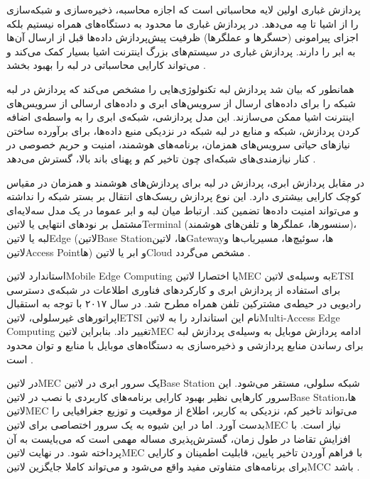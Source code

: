 پردازش غباری اولین لایه محاسباتی است که اجازه محاسبه، ذخیره‌سازی و شبکه‌سازی را از اشیا تا مِه می‌دهد. در پردازش غباری ما محدود به دستگاه‌های همراه نیستیم بلکه اجزای پیرامونی (حسگرها و عملگرها)
ظرفیت پیش‌پردازش داده‌ها قبل از ارسال آن‌ها به ابر را دارند. پردازش غباری در سیستم‌های بزرگ اینترنت اشیا بسیار کمک می‌کند و می‌تواند کارایی محاسباتی در لبه را بهبود بخشد
.


همانطور که بیان شد پردازش لبه تکنولوژی‌هایی را مشخص می‌کند که پردازش در لبه شبکه را برای داده‌های ارسال از سرویس‌های ابری و داده‌های ارسالی از سرویس‌های اینترنت اشیا ممکن می‌سازند.
این مدل پردازشی، شبکه‌ی ابری را به واسطه‌ی اضافه کردن پردازش، شبکه و منابع در لبه شبکه در نزدیکی منبع داده‌ها، برای برآورده ساختن نیازهای حیاتی سرویس‌های همزمان، برنامه‌های هوشمند،
امنیت و حریم خصوصی در کنار نیازمندی‌های شبکه‌ای چون تاخیر کم و پهنای باند بالا، گسترش می‌دهد
.

در مقابل پردازش ابری، پردازش در لبه برای پردازش‌های هوشمند و همزمان در مقیاس کوچک کارایی بیشتری دارد. این نوع پردازش ریسک‌های انتقال بر بستر شبکه را نداشته و می‌تواند امنیت داده‌ها تضمین کند.
ارتباط میان لبه و ابر عموما در یک مدل سه‌لایه‌ای مشتمل بر نودهای انتهایی یا ‌لاتین{Terminal} (سنسورها، عملگرها و تلفن‌های هوشمند)،
لبه یا ‌لاتین{Edge} (‌لاتین{Base Station}ها، ‌لاتین{Gateway}ها، سوئیچ‌ها، مسیریاب‌ها و ‌لاتین{Access Point}ها)
و ابر یا ‌لاتین{Cloud} مشخص می‌گردد
.


استاندارد ‌لاتین{Mobile Edge Computing} یا اختصارا ‌لاتین{MEC} به وسیله‌ی ‌لاتین{ETSI} برای استفاده از پردازش ابری و کارکردهای فناوری اطلاعات در شبکه‌ی دسترسی رادیویی
در حیطه‌ی مشترکین تلفن همراه مطرح شد. در سال ۲۰۱۷ با توجه به استقبال اپراتورهای غیرسلولی، ‌لاتین{ETSI} نام این استاندارد را به ‌لاتین{Multi-Access Edge Computing}
تغییر داد. بنابراین ‌لاتین{MEC} ادامه پردازش موبایل به وسیله‌ی پردازش لبه برای رساندن منابع پردازشی و ذخیره‌سازی به دستگاه‌های موبایل با منابع و توان محدود است
.

در ‌لاتین{MEC} یک سرور ابری در ‌لاتین{Base Station} شبکه سلولی، مستقر می‌شود. این سرور کارهایی نظیر بهبود کارایی برنامه‌های کاربردی
با نصب در ‌لاتین{Base Station}ها، ‌لاتین{MEC} می‌تواند تاخیر کم، نزدیکی به کاربر، اطلاع از موقعیت و توزیع جغرافیایی را بدست آورد.
اما در این شیوه به یک سرور اختصاصی برای ‌لاتین{MEC} نیاز است.
با افزایش تقاضا در طول زمان، گسترش‌پذیری مساله مهمی است که می‌بایست به آن پرداخته شود.
در نهایت ‌لاتین{MEC} با فراهم آوردن تاخیر پایین، قابلیت اطمینان و کارایی برای برنامه‌های متفاوتی مفید واقع می‌شود و می‌تواند کاملا جایگزین ‌لاتین{MCC} باشد
.

